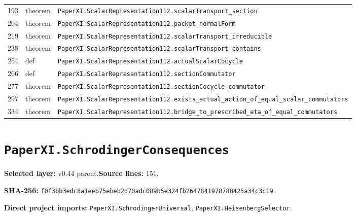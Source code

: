 \documentclass[10pt,oneside]{book}
\begin{document}
\begin{longtable}{@{}p{}p{}p{}@{}}
193&theorem&\nolinkurl{PaperXI.ScalarRepresentation112.scalarTransport_section}\\

204&theorem&\nolinkurl{PaperXI.ScalarRepresentation112.packet_normalForm}\\

219&theorem&\nolinkurl{PaperXI.ScalarRepresentation112.scalarTransport_irreducible}\\

238&theorem&\nolinkurl{PaperXI.ScalarRepresentation112.scalarTransport_contains}\\

254&def&\nolinkurl{PaperXI.ScalarRepresentation112.actualScalarCocycle}\\

266&def&\nolinkurl{PaperXI.ScalarRepresentation112.sectionCommutator}\\

277&theorem&\nolinkurl{PaperXI.ScalarRepresentation112.sectionCocycle_commutator}\\

297&theorem&\nolinkurl{PaperXI.ScalarRepresentation112.exists_actual_action_of_equal_scalar_commutators}\\

334&theorem&\nolinkurl{PaperXI.ScalarRepresentation112.bridge_to_prescribed_eta_of_equal_commutators}\\

\bottomrule\end{longtable}

\section{\texorpdfstring{\nolinkurl{PaperXI.SchrodingerConsequences}}{PaperXI.SchrodingerConsequences}}\label{module:PaperXI.SchrodingerConsequences}

\textbf{Selected layer:} v0.44 parent.\quad\textbf{Source lines:} 151.\par\textbf{SHA-256:} {\scriptsize\nolinkurl{f0f3bb3edc8a1eeb75ebeb2d70adc089b5e324fb2647841978788425a34c3c19}}.


\textbf{Direct project imports:} \nolinkurl{PaperXI.SchrodingerUniversal}, \nolinkurl{PaperXI.HeisenbergSelector}.
\end{document}
